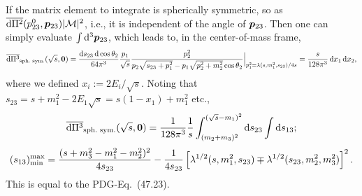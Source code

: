 \documentclass[CheatSheet]{subfiles}
\begin{document}
If the matrix element to integrate is spherically symmetric, so as $\overline{\mathop{}\!\mathrm{d}\Pi^2}(p^0_{23}, {\boldsymbol{p}}_{23})|\mathcal M|^2$, i.e., it is independent of the angle of ${\boldsymbol{p}}_{23}$. Then one can simply evaluate  $\int\mathop{}\!\mathrm{d}^3{\boldsymbol{p}}_{23}$, which leads to, in the center-of-mass frame,
\begin{equation}
\overline{\mathop{}\!\mathrm{d}\Pi^3}_{\text{sph.\ sym.}}(\sqrt{s}, {\boldsymbol{0}})
=
\frac{\mathop{}\!\mathrm{d} s_{23}\mathop{}\!\mathrm{d}\cos\theta_{2}}{64\pi^3}
\frac{p_1}{\sqrt s}
\frac{p_{2}^2}{p_2\sqrt{s_{23}+p_1^2} - p_1\sqrt{p_2^2+m_2^2}\cos\theta_2}\Big|_{
 p_1^2=\lambda(s,m_1^2,s_{23})/4s
}
= \frac{s}{128\pi^3}\mathop{}\!\mathrm{d} x_1\mathop{}\!\mathrm{d} x_2,
\end{equation}
where we defined $x_i:={2E_i}/{\sqrt s}$. Noting that $s_{23}=s+m_1^2-2E_1\sqrt{s}=s(1-x_1)+m_1^2$ etc., 
\begin{equation}
 \overline{\dd\Pi^3}_{\text{sph.\ sym.}}(\sqrt{s}, \vc 0)
=
\frac{1}{128\pi^3}\frac{1}{s}
\int_{(m_2+m_3)^2}^{(\sqrt{s}-m_1)^2}\dd s_{23}\int\dd s_{13};
\end{equation}
\begin{equation}
 (s_{13})^{\text{max}}_{\text{min}} =
\frac{(s+m_3^2-m_1^2-m_2^2)^2}{4s_{23}}
-\frac{1}{4s_{23}}
\left[\Kallen[1/2](s,m_1^2,s_{23})\mp\Kallen[1/2](s_{23},m_2^2,m_3^2)\right]^2.
\end{equation}
This is equal to the PDG-Eq.~(47.23)\cite{PDG2018}.
\end{document}
